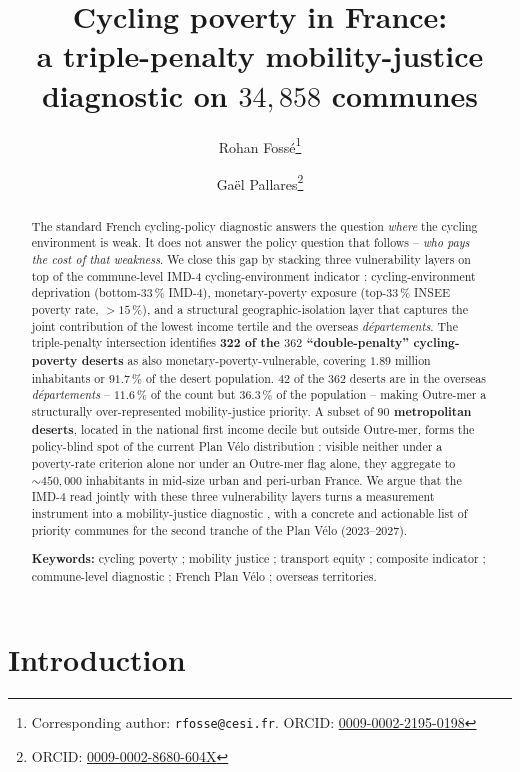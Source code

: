 \documentclass[11pt,a4paper]{article}
\title{\Large\bfseries Cycling poverty in France:\\
\large a triple-penalty mobility-justice diagnostic on $34{,}858$ communes}
\author[1]{Rohan Foss\'e\thanks{Corresponding author: \texttt{rfosse@cesi.fr}. ORCID: \href{https://orcid.org/0009-0002-2195-0198}{0009-0002-2195-0198}}}
\author[2]{Ga\"el Pallares\thanks{ORCID: \href{https://orcid.org/0009-0002-8680-604X}{0009-0002-8680-604X}}}
\affil[1]{CESI Engineering School, Montpellier, France}
\affil[2]{CESI LINEACT (EA 7527), Montpellier, France}
\date{}
\begin{document}
\maketitle

\begin{abstract}
\noindent
The standard French cycling-policy diagnostic answers the question
\emph{where} the cycling environment is weak.  It does not answer
the policy question that follows -- \emph{who pays the cost of that
weakness}.  We close this gap by stacking three vulnerability
layers on top of the commune-level IMD-4 cycling-environment
indicator \citep{Fosse2026imd_national} : cycling-environment
deprivation (bottom-$33\,\%$ IMD-4), monetary-poverty exposure
(top-$33\,\%$ INSEE poverty rate, $> 15\,\%$), and a structural
geographic-isolation layer that captures the joint contribution of
the lowest income tertile and the overseas \emph{d\'epartements}.
The triple-penalty intersection identifies \textbf{322 of the
$362$ ``double-penalty'' cycling-poverty deserts} as also
monetary-poverty-vulnerable, covering $1.89$ million inhabitants
or $91.7\,\%$ of the desert population.  $42$ of the $362$ deserts
are in the overseas \emph{d\'epartements} -- $11.6\,\%$ of the
count but $36.3\,\%$ of the population -- making
Outre-mer a structurally over-represented mobility-justice
priority.  A subset of \textbf{$90$ metropolitan deserts}, located
in the national first income decile but outside Outre-mer, forms
the policy-blind spot of the current Plan V\'elo distribution :
visible neither under a poverty-rate criterion alone nor under an
Outre-mer flag alone, they aggregate to $\sim 450{,}000$
inhabitants in mid-size urban and peri-urban France.  We argue
that the IMD-4 read jointly with these three vulnerability layers
turns a measurement instrument into a mobility-justice diagnostic
\citep{Pereira2017,Verlinghieri2020}, with a concrete and
actionable list of priority communes for the second tranche of
the Plan V\'elo (2023--2027).

\noindent\textbf{Keywords:}
cycling poverty ; mobility justice ; transport equity ; composite
indicator ; commune-level diagnostic ; French Plan V\'elo ;
overseas territories.
\end{abstract}

\section{Introduction}
\label{sec:intro}
\end{document}
